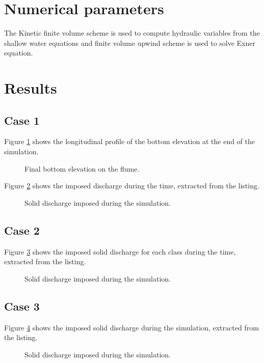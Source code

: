 \section{Numerical parameters}
%
The Kinetic finite volume scheme is used to compute hydraulic variables from the
 shallow water equations and finite volume upwind scheme is used to solve Exner
 equation.
%
\section{Results}
%
\subsection{Case 1}
%
Figure \ref{flumebc:profile} shows the longitudinal profile of the bottom
elevation at the end of the simulation.
%
\begin{figure}[H]
 \centering
 \caption{Final bottom elevation on the flume.}
 \label{flumebc:profile}
\end{figure}
%
Figure \ref{flumebc:discharge1} shows the imposed discharge during the time,
extracted from the listing.
%
\begin{figure}[H]
 \centering
 \caption{Solid discharge imposed during the simulation.}
 \label{flumebc:discharge1}
\end{figure}
%
\subsection{Case 2}
%
Figure \ref{flumebc:discharge2} shows the imposed solid discharge for each class
 during the time, extracted from the listing.
%
\begin{figure}[H]
 \centering
 \caption{Solid discharge imposed during the simulation.}
 \label{flumebc:discharge2}
\end{figure}
%
\subsection{Case 3}
%
Figure \ref{flumebc:discharge3} shows the imposed solid discharge during the
 simulation, extracted from the listing.
%
\begin{figure}[H]
 \centering
 \caption{Solid discharge imposed during the simulation.}
 \label{flumebc:discharge3}
\end{figure}
%
